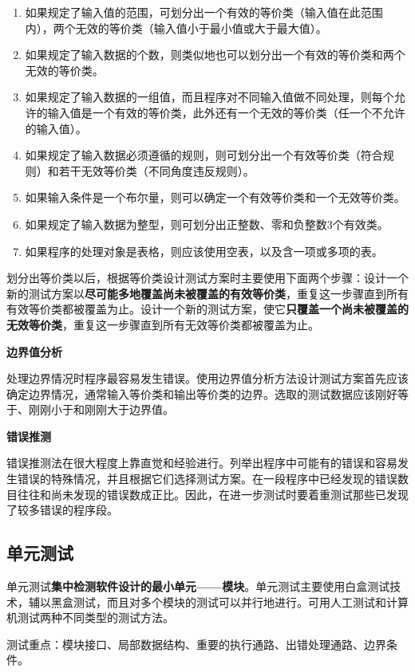 \documentclass[cn, blue, normal, 12pt]{elegantnote}
\begin{document}
\begin{enumerate}
    \item 如果规定了输入值的范围，可划分出一个有效的等价类（输入值在此范围内），两个无效的等价类（输入值小于最小值或大于最大值）。
    \item 如果规定了输入数据的个数，则类似地也可以划分出一个有效的等价类和两个无效的等价类。
    \item 如果规定了输入数据的一组值，而且程序对不同输入值做不同处理，则每个允许的输入值是一个有效的等价类，此外还有一个无效的等价类（任一个不允许的输入值）。
    \item 如果规定了输入数据必须遵循的规则，则可划分出一个有效等价类（符合规则）和若干无效等价类（不同角度违反规则）。
    \item 如果输入条件是一个布尔量，则可以确定一个有效等价类和一个无效等价类。
    \item 如果规定了输入数据为整型，则可划分出正整数、零和负整数3个有效类。
    \item 如果程序的处理对象是表格，则应该使用空表，以及含一项或多项的表。
\end{enumerate}

划分出等价类以后，根据等价类设计测试方案时主要使用下面两个步骤：设计一个新的测试方案以\textbf{尽可能多地覆盖尚未被覆盖的有效等价类}，重复这一步骤直到所有有效等价类都被覆盖为止。设计一个新的测试方案，使它\textbf{只覆盖一个尚未被覆盖的无效等价类}，重复这一步骤直到所有无效等价类都被覆盖为止。

\textbf{边界值分析}

处理边界情况时程序最容易发生错误。使用边界值分析方法设计测试方案首先应该确定边界情况，通常输入等价类和输出等价类的边界。选取的测试数据应该刚好等于、刚刚小于和刚刚大于边界值。

\textbf{错误推测}

错误推测法在很大程度上靠直觉和经验进行。列举出程序中可能有的错误和容易发生错误的特殊情况，并且根据它们选择测试方案。在一段程序中已经发现的错误数目往往和尚未发现的错误数成正比。因此，在进一步测试时要着重测试那些已发现了较多错误的程序段。

\subsection{单元测试}

单元测试\textbf{集中检测软件设计的最小单元——模块}。单元测试主要使用白盒测试技术，辅以黑盒测试，而且对多个模块的测试可以并行地进行。可用人工测试和计算机测试两种不同类型的测试方法。

测试重点：模块接口、局部数据结构、重要的执行通路、出错处理通路、边界条件。
\end{document}

